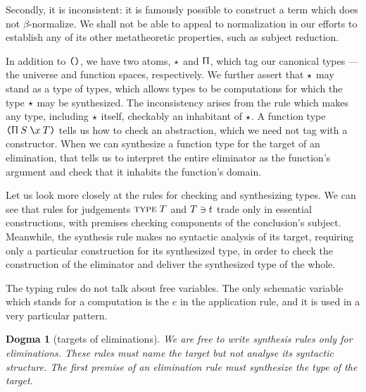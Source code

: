 \documentclass{jfp1}
\newtheorem{dogma}[theorem]{Dogma}
\newcommand{\Pa}[1]{\texttt{(}#1\texttt{)}}
\begin{document}
Secondly, it is inconsistent: it is famously possible to construct a term
which does not $\beta$-normalize. We shall not be able to appeal to normalization
in our efforts to establish any of its other metatheoretic properties, such as
subject reduction.

In addition to $\Pa$, we have two atoms, $\star$ and $\Uppi$, which tag our canonical
types --- the universe and function spaces, respectively. We further assert that
$\star$ may stand as a type of types, which allows types to be computations for which
the type $\star$ may be synthesized. The inconsistency arises from the rule which
makes any type, including $\star$ itself, checkably an inhabitant of $\star$. A
function type $\PI SxT$ tells us how to check an abstraction, which we need not
tag with a constructor. When we can synthesize a function type for the target
of an elimination, that tells us to interpret the entire eliminator as the function's
argument and check that it inhabits the function's domain.

Let us look more closely at the rules for checking and synthesizing types. We can see that
rules for judgements $\textsc{type}\;T$ and $T \ni t$ trade only in essential constructions,
with premises checking components of the conclusion's subject. Meanwhile, the synthesis
rule makes no syntactic analysis of its target, requiring only a particular construction
for its synthesized type, in order to check the construction of the eliminator
and deliver the synthesized type of the whole.

The typing rules do not talk about free variables. The only schematic variable
which stands for a computation is the $e$ in the application rule, and it is used in a
very particular pattern.

\begin{dogma}[targets of eliminations]
  We are free to write synthesis rules only for eliminations. These rules must
  name the target but not analyse its syntactic structure. The first premise
  of an elimination rule must synthesize the type of the target.
\end{dogma}
\end{document}
